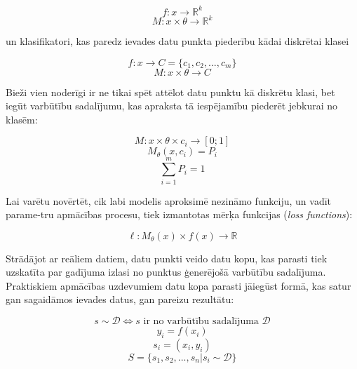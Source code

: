 \documentclass[12pt, a4paper]{article}
\numberwithin{equation}{section} %
\begin{document}
\begin{equation} 
    f:x \rightarrow \mathbb{R}^k
\end{equation}
\begin{equation} 
    M: x \times \theta \rightarrow \mathbb{R}^k
\end{equation}

un klasifikatori, kas paredz ievades datu punkta piederību kādai diskrētai klasei

\begin{equation} 
    f:x \rightarrow C = \lbrace c_1, c_2, ..., c_m \rbrace
\end{equation}
\begin{equation} 
     M: x \times \theta \rightarrow C
\end{equation}

Bieži vien noderīgi ir ne tikai spēt attēlot datu punktu kā diskrētu klasi, bet iegūt varbūtību sadalījumu, kas apraksta tā iespējamību piederēt jebkurai no klasēm:

\begin{equation} 
    M: x \times \theta \times c_i \rightarrow [0; 1]
\end{equation}
\begin{equation} 
    M_{\theta}(x, c_i) = P_i
\end{equation}
\begin{equation} 
    \sum_{i=1}^m P_i = 1
\end{equation}

Lai varētu novērtēt, cik labi modelis aproksimē nezināmo funkciju, un vadīt parame-tru apmācības procesu, tiek izmantotas mērķa funkcijas (\textit{loss functions})\cite{notation}:

\begin{equation} 
    \ell: M_{\theta}(x) \times f(x) \rightarrow \mathbb{R}
\end{equation}

Strādājot ar reāliem datiem, datu punkti veido datu kopu, kas parasti tiek uzskatīta par gadījuma izlasi no punktus ģenerējošā varbūtību sadalījuma. Praktiskiem apmācības uzdevumiem datu kopa parasti jāiegūst formā, kas satur gan sagaidāmos ievades datus, gan pareizu rezultātu:

\begin{equation} 
    s \sim \mathcal{D} \Leftrightarrow s \text{ ir no varbūtību sadalījuma } \mathcal{D}
\end{equation}
\begin{equation} 
    y_i = f(x_i)
\end{equation}
\begin{equation} 
    s_i = (x_i, y_i)
\end{equation}
\begin{equation} 
    S = \lbrace s_1, s_2, ..., s_n \vert s_i \sim \mathcal{D}\rbrace
\end{equation}
\end{document}
